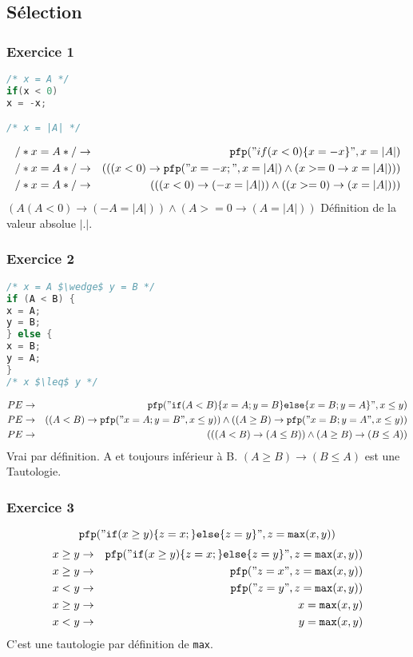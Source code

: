 \subsection{Sélection} \label{exoPfpSelect}
\subsubsection{Exercice 1}
\begin{lstlisting}[language=C]
/* x = A */
if(x < 0)
x = -x;

/* x = |A| */
\end{lstlisting}

\begin{eqnarray*}
/*x = A*/ &\rightarrow& \pfp ("if(x < 0)\{ x = -x \}", x = |A|)\\
/*x = A*/ &\rightarrow& (((x<0)\rightarrow \pfp ("x=-x;", x = |A| ) \wedge (x >= 0 \rightarrow x = |A|)))\\
/*x = A*/ &\rightarrow& (((x < 0) \rightarrow (-x = |A|)) \wedge (( x >= 0) \rightarrow (x = |A|)))\\
\end{eqnarray*}
$( A ( A < 0) \rightarrow (-A = |A|) ) \wedge (A >= 0 \rightarrow (A=|A|))$
Définition de la valeur absolue $|.|$.

\subsubsection{Exercice 2}
\begin{lstlisting}[language=C]
/* x = A $\wedge$ y = B */
if (A < B) {
x = A;
y = B;
} else {
x = B;
y = A;
}
/* x $\leq$ y */ 
\end{lstlisting}
\begin{eqnarray*}
PE &\rightarrow& \pfp ("\ifp (A < B) \{ x = A; y = B\}\elsep \{ x = B; y =A\}", x \leq y)\\
PE&\rightarrow&((A<B)\rightarrow\pfp("x=A;y=B",x\leq y))\wedge((A\geq B)\rightarrow\pfp("x=B;y=A",x\leq y))\\
PE &\rightarrow& ((( A < B) \rightarrow (A \leq B)) \wedge (A \geq B ) \rightarrow (B \leq A))
\end{eqnarray*}
Vrai par définition. A et toujours inférieur à B. $(A \geq B) \rightarrow (B \leq A)$ est une Tautologie. 
\subsubsection{Exercice 3}
$$\pfp ("\ifp (x \geq y )\{z=x;\}\elsep\{z=y\}",z=\texttt{max}(x,y))$$
\begin{eqnarray*}
x \geq y  &\rightarrow&	\pfp ("\ifp (x \geq y )\{z=x;\}\elsep\{z=y\}",z=\texttt{max}(x,y))\\
x \geq y &\rightarrow& \pfp ("z = x", z = \texttt{max}(x,y))\\
x < y &\rightarrow& \pfp ("z = y", z = \texttt{max}(x,y))\\
x \geq y &\rightarrow& x = \texttt{max}(x,y)\\
x < y &\rightarrow& y = \texttt{max}(x,y)
\end{eqnarray*}
C'est une tautologie par définition de \texttt{max}.

